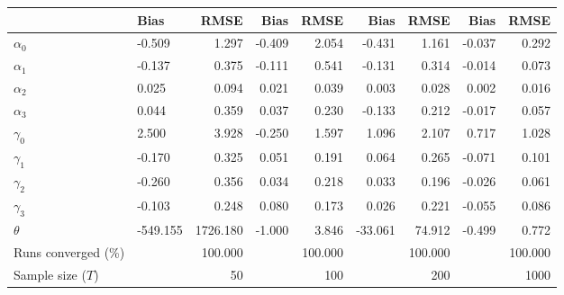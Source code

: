 
\begin{tabular}[t]{llrrrrrrr}
\toprule
  & Bias & RMSE & Bias & RMSE & Bias & RMSE & Bias & RMSE\\
\midrule
$\alpha_{0}$ & -0.509 & 1.297 & -0.409 & 2.054 & -0.431 & 1.161 & -0.037 & 0.292\\
$\alpha_{1}$ & -0.137 & 0.375 & -0.111 & 0.541 & -0.131 & 0.314 & -0.014 & 0.073\\
$\alpha_{2}$ & 0.025 & 0.094 & 0.021 & 0.039 & 0.003 & 0.028 & 0.002 & 0.016\\
$\alpha_{3}$ & 0.044 & 0.359 & 0.037 & 0.230 & -0.133 & 0.212 & -0.017 & 0.057\\
$\gamma_{0}$ & 2.500 & 3.928 & -0.250 & 1.597 & 1.096 & 2.107 & 0.717 & 1.028\\
$\gamma_{1}$ & -0.170 & 0.325 & 0.051 & 0.191 & 0.064 & 0.265 & -0.071 & 0.101\\
$\gamma_{2}$ & -0.260 & 0.356 & 0.034 & 0.218 & 0.033 & 0.196 & -0.026 & 0.061\\
$\gamma_{3}$ & -0.103 & 0.248 & 0.080 & 0.173 & 0.026 & 0.221 & -0.055 & 0.086\\
$\theta$ & -549.155 & 1726.180 & -1.000 & 3.846 & -33.061 & 74.912 & -0.499 & 0.772\\
Runs converged (\%) &  & 100.000 &  & 100.000 &  & 100.000 &  & 100.000\\
Sample size ($T$) &  & 50 &  & 100 &  & 200 &  & 1000\\
\bottomrule
\end{tabular}
